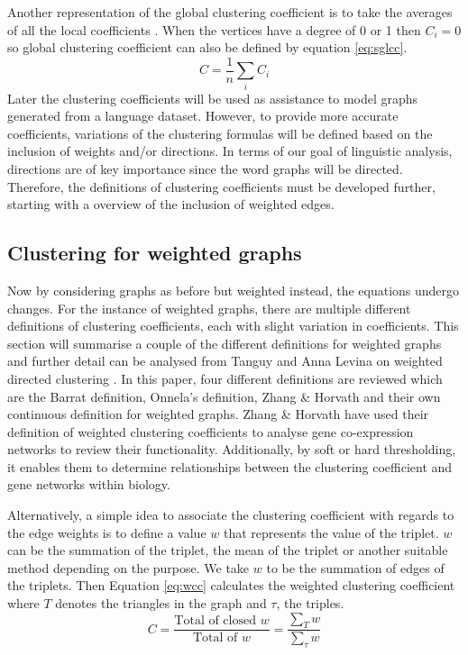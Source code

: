 Another representation of the global clustering coefficient is to take the averages of all the local coefficients \cite{https://doi.org/10.48550/arxiv.1410.1997}. When the vertices have a degree of 0 or 1 then $C_i = 0$ so global clustering coefficient can also be defined by equation \ref{eq:sglcc}.
\begin{equation} \label{eq:sglcc}
C = \frac{1}{n}\sum_i{C_i}
\end{equation}
Later the clustering coefficients will be used as assistance to model graphs generated from a language dataset. However, to provide more accurate coefficients, variations of the clustering formulas will be defined based on the inclusion of weights and/or directions. In terms of our goal of linguistic analysis, directions are of key importance since the word graphs will be directed. Therefore, the definitions of clustering coefficients must be developed further, starting with a overview of the inclusion of weighted edges.

\subsection{Clustering for weighted graphs}
Now by considering graphs as before but weighted instead, the equations undergo changes. For the instance of weighted graphs, there are multiple different definitions of clustering coefficients, each with slight variation in coefficients. This section will summarise a couple of the different definitions for weighted graphs and further detail can be analysed from Tanguy and Anna Levina on weighted directed clustering \cite{PhysRevResearch.3.043124}. In this paper, four different definitions are reviewed which are the Barrat definition, Onnela's definition, Zhang \& Horvath and their own continuous definition for weighted graphs. Zhang \& Horvath \cite{ZhangHorvath+2005} have used their definition of weighted clustering coefficients to analyse gene co-expression networks to review their functionality. Additionally, by soft or hard thresholding, it enables them to determine relationships between the clustering coefficient and gene networks within biology.

Alternatively, a simple idea to associate the clustering coefficient with regards to the edge weights is to define a value $w$ that represents the value of the triplet. $w$ can be the summation of the triplet, the mean of the triplet or another suitable method depending on the purpose. We take $w$ to be the summation of edges of the triplets. Then Equation \ref{eq:wcc} calculates the weighted clustering coefficient \cite{opsahl2009clustering} where $T$ denotes the triangles in the graph and $\tau$, the triples.
\begin{equation} \label{eq:wcc}
C = \frac{\text{Total of closed }w}{\text{Total of }w} = \frac{\sum_T{w}}{\sum_\tau{w}}
\end{equation}

